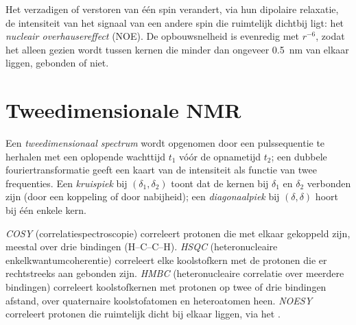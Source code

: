 \begin{definition}\label{def:b3:advanced-nmr:noe}
Het verzadigen of verstoren van één spin verandert, via hun dipolaire
relaxatie, de intensiteit van het signaal van een andere spin die
ruimtelijk dichtbij ligt: het
\emph{nucleair overhausereffect} (NOE).
De opbouwsnelheid is evenredig met $r^{-6}$, zodat het alleen gezien wordt
tussen kernen die minder dan ongeveer \qty{0.5}{nm} van elkaar liggen,
gebonden of niet.
\end{definition}

\section{Tweedimensionale NMR}

\begin{definition}\label{def:b3:advanced-nmr:two-d}
Een \emph{tweedimensionaal spectrum} wordt
opgenomen door een pulssequentie te herhalen met een oplopende
wachttijd $t_1$ vóór de
opnametijd $t_2$; een dubbele fouriertransformatie geeft een kaart van de
intensiteit als functie van twee frequenties. Een
\emph{kruispiek} bij $(\delta_1,
\delta_2)$ toont dat de kernen bij $\delta_1$ en $\delta_2$ verbonden zijn
(door een koppeling of door nabijheid); een
\emph{diagonaalpiek} bij $(\delta, \delta)$ hoort bij
één enkele kern.
\end{definition}

\begin{definition}\label{def:b3:advanced-nmr:experiments}
\emph{COSY} (correlatiespectroscopie) correleert protonen die
met elkaar gekoppeld zijn,
meestal over drie bindingen (H--C--C--H). \emph{HSQC}
(heteronucleaire enkelkwantumcoherentie) correleert elke koolstofkern met
de protonen die er rechtstreeks aan gebonden zijn.
\emph{HMBC} (heteronucleaire correlatie over meerdere
bindingen) correleert koolstofkernen met protonen op twee of drie
bindingen afstand, over quaternaire koolstofatomen en heteroatomen heen.
\emph{NOESY} correleert protonen die ruimtelijk dicht bij
elkaar liggen, via het .
\end{definition}

